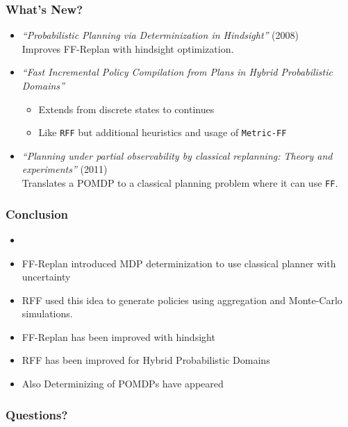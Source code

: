 \documentclass{beamer}
\let\origframetitle=\frametitle
\renewcommand\frametitle[1]{\origframetitle{\textbf{\large{\textrm{#1}}}}}
\begin{document}
\begin{frame}
  \frametitle{What's New?}

  \begin{itemize}
    \item \emph{``Probabilistic Planning via Determinization in Hindsight''} (2008) \\
      Improves FF-Replan with hindsight optimization.
    \item \emph{``Fast Incremental Policy Compilation from Plans in Hybrid Probabilistic Domains''}
      \begin{itemize}
        \item Extends from discrete states to continues
        \item Like \texttt{RFF} but additional heuristics and usage of \texttt{Metric-FF}
      \end{itemize}
    \item \emph{``Planning under partial observability by classical replanning: Theory and experiments''} (2011) \\
      Translates a POMDP to a classical planning problem where it can use \texttt{FF}.
  \end{itemize}

\end{frame}

\begin{frame}
  \frametitle{Conclusion}

  \begin{itemize}
    \item
    \item FF-Replan introduced MDP determinization to use classical planner with uncertainty
    \item RFF used this idea to generate policies using aggregation and Monte-Carlo simulations.
    \item FF-Replan has been improved with hindsight
    \item RFF has been improved for Hybrid Probabilistic Domains
    \item Also Determinizing of POMDPs have appeared
  \end{itemize}

\end{frame}


\begin{frame}
  \frametitle{Questions?}
\end{frame}
\end{document}
